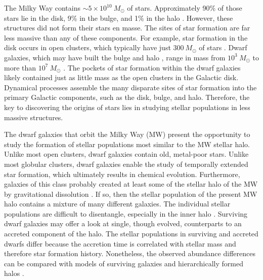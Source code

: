 \documentclass{emulateapj}
\begin{document}
The Milky Way contains $\sim 5 \times 10^{10}~M_{\odot}$ of
stars.  Approximately 90\% of those stars lie in the disk, 9\% in the
bulge, and 1\% in the halo \citep{bin08}.  However, these structures
did not form their stars en masse.  The sites of star formation are
far less massive than any of these components.  For example, star
formation in the disk occurs in open clusters, which typically have
just $300~M_{\odot}$ of stars \citep{pis07}.  Dwarf galaxies, which
may have built the bulge and halo \citep{sea78,whi78}, range in mass
from $10^3~M_{\odot}$ \citep[e.g., Segue~1;][]{mar08} to more than
$10^7~M_{\odot}$ \citep[e.g., Fornax;][]{irw95,mat98}.  The pockets of
star formation within the dwarf galaxies likely contained just as
little mass as the open clusters in the Galactic disk.  Dynamical
processes assemble the many disparate sites of star formation into the
primary Galactic components, such as the disk, bulge, and halo.
Therefore, the key to discovering the origins of stars lies in
studying stellar populations in less massive structures.

The dwarf galaxies that orbit the Milky Way (MW) present the
opportunity to study the formation of stellar populations most similar
to the MW stellar halo.  Unlike most open clusters, dwarf galaxies
contain old, metal-poor stars.  Unlike most globular clusters, dwarf
galaxies enable the study of temporally extended star formation, which
ultimately results in chemical evolution.  Furthermore, galaxies of
this class probably created at least some of the stellar halo of the
MW by gravitational dissolution \citep[e.g.,][]{maj93,maj96,bel08}.
If so, then the stellar population of the present MW halo contains a
mixture of many different galaxies.  The individual stellar
populations are difficult to disentangle, especially in the inner halo
\citep[e.g.,][]{coo10}.  Surviving dwarf galaxies may offer a look at
single, though evolved, counterparts to an accreted component of the
halo.  The stellar populations in surviving and accreted dwarfs differ
because the accretion time is correlated with stellar mass and
therefore star formation history.  Nonetheless, the observed abundance
differences can be compared with models of surviving galaxies and
hierarchically formed halos \citep[e.g.,][]{rob05,fon06}.
\end{document}
